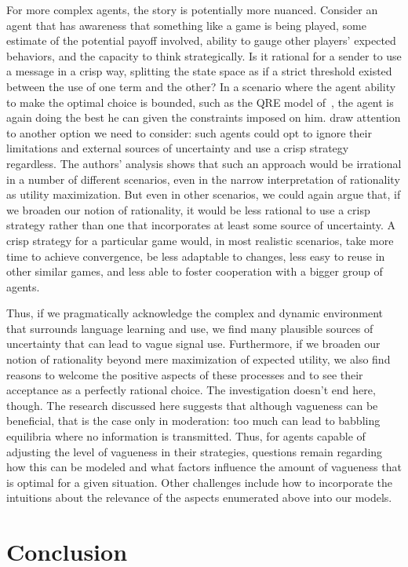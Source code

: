 \documentclass[a4paper]{article}
\begin{document}
For more complex agents, the story is potentially more nuanced.
Consider an agent that has awareness that something like a game is being played, some estimate of the potential payoff involved, ability to gauge other players' expected behaviors, and the capacity to think strategically.
Is it rational for a sender to use a message in a crisp way, splitting the state space as if a strict threshold existed between the use of one term and the other?
In a scenario where the agent ability to make the optimal choice is bounded, such as the QRE model of~\textcite{franke_vagueness_2011}, the agent is again doing the best he can given the constraints imposed on him.
\textcite{lawry_vagueness_2017} draw attention to another option we need to consider: such agents could opt to ignore their limitations and external sources of uncertainty and use a crisp strategy regardless.
The authors' analysis shows that such an approach would be irrational in a number of different scenarios, even in the narrow interpretation of rationality as utility maximization.
But even in other scenarios, we could again argue that, if we broaden our notion of rationality, it would be less rational to use a crisp strategy rather than one that incorporates at least some source of uncertainty.
A crisp strategy for a particular game would, in most realistic scenarios, take more time to achieve convergence, be less adaptable to changes, less easy to reuse in other similar games, and less able to foster cooperation with a bigger group of agents.

Thus, if we pragmatically acknowledge the complex and dynamic environment that surrounds language learning and use, we find many plausible sources of uncertainty that can lead to vague signal use.
Furthermore, if we broaden our notion of rationality beyond mere maximization of expected utility, we also find reasons to welcome the positive aspects of these processes and to see their acceptance as a perfectly rational choice.
The investigation doesn't end here, though.
The research discussed here suggests that although vagueness can be beneficial, that is the case only in moderation: too much can lead to babbling equilibria where no information is transmitted.
Thus, for agents capable of adjusting the level of vagueness in their strategies, questions remain regarding how this can be modeled and what factors influence the amount of vagueness that is optimal for a given situation.
Other challenges include how to incorporate the intuitions about the relevance of the aspects enumerated above into our models.

\section{Conclusion}
\label{sec:conclusion}

\printbibliography
\end{document}
